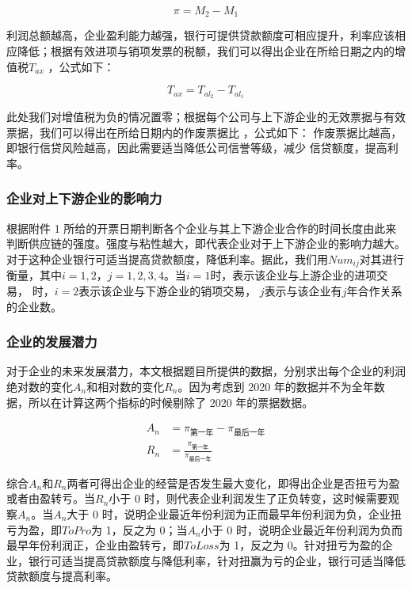 \documentclass[UTF8]{ctexart}
\begin{document}
\begin{equation}
	\pi =M_2-M_1
\end{equation}

利润总额越高，企业盈利能力越强，银行可提供贷款额度可相应提升，利率应该相应降低；根据有效进项与销项发票的税额，我们可以得出企业在所给日期之内的增值税$T_{ax}$ ，公式如下：

\begin{equation}
	T_{ax}=T_{al_2}-T_{al_1}
\end{equation}

此处我们对增值税为负的情况置零；根据每个公司与上下游企业的无效票据与有效票据，我们可以得出在所给日期内的作废票据比 ，公式如下：
作废票据比越高，即银行信贷风险越高，因此需要适当降低公司信誉等级，减少	信贷额度，提高利率。

\subsubsection{企业对上下游企业的影响力}
根据附件 1 所给的开票日期判断各个企业与其上下游企业合作的时间长度由此来		判断供应链的强度。强度与粘性越大，即代表企业对于上下游企业的影响力越大。对于这种企业银行可适当提高贷款额度，降低利率。据此，我们用$Num_{ij}$对其进行衡量，其中$i=1,2$，$j=1,2,3,4$。当$i=1$时，表示该企业与上游企业的进项交易，
时，$i=2$表示该企业与下游企业的销项交易， $j$表示与该企业有$j$年合作关系的企业数。

\subsubsection{企业的发展潜力}
对于企业的未来发展潜力，本文根据题目所提供的数据，分别求出每个企业的利润绝对数的变化$A_n$和相对数的变化$R_n$。因为考虑到 2020 年的数据并不为全年数据，所以在计算这两个指标的时候剔除了 2020 年的票据数据。

\begin{equation}
	\begin{aligned}
		A_n & =\pi_{\mbox{第一年}} - \pi_{\mbox{最后一年}}       \\
		R_n & =\frac{\pi_{\mbox{第一年}}}{\pi_{\mbox{最后一年}}}
	\end{aligned}
\end{equation}

综合$A_n$和$R_n$两者可得出企业的经营是否发生最大变化，即得出企业是否扭亏为盈或者由盈转亏。当$R_n$小于 0 时，则代表企业利润发生了正负转变，这时候需要观察$A_n$。当$A_n$大于 0 时，说明企业最近年份利润为正而最早年份利润为负，企业扭亏为盈，即$ToPro$为 1，反之为 0；当$A_n$小于 0 时，说明企业最近年份利润为负而最早年份利润正，企业由盈转亏，即$ToLoss$为 1，反之为 0。针对扭亏为盈的企业，银行可适当提高贷款额度与降低利率，针对扭赢为亏的企业，银行可适当降低贷款额度与提高利率。
\end{document}
